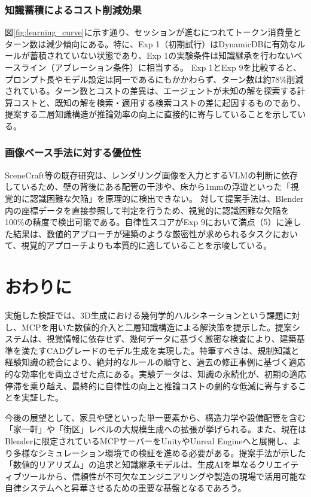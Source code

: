 \documentclass[dvipdfmx, a4paper, 9pt]{deimj}
\begin{document}
\subsubsection{知識蓄積によるコスト削減効果}
図\ref{fig:learning_curve}に示す通り、セッションが進むにつれてトークン消費量とターン数は減少傾向にある。特に、Exp 1（初期試行）はDynamicDBに有効なルールが蓄積されていない状態であり、Exp 1の実験条件は知識継承を行わないベースライン（アブレーション条件）に相当する。
Exp 1とExp 9を比較すると、プロンプト長やモデル設定は同一であるにもかかわらず、ターン数は約78\%削減されている。ターン数とコストの差異は、エージェントが未知の解を探索する計算コストと、既知の解を検索・適用する検索コストの差に起因するものであり、提案する二層知識構造が推論効率の向上に直接的に寄与していることを示している。

\subsubsection{画像ベース手法に対する優位性}
SceneCraft等の既存研究は、レンダリング画像を入力とするVLMの判断に依存しているため、壁の背後にある配管の干渉や、床から1mmの浮遊といった「視覚的に認識困難な欠陥」を原理的に検出できない。
対して提案手法は、Blender内の座標データを直接参照して判定を行うため、視覚的に認識困難な欠陥を100\%の精度で検出可能である。自律性スコアがExp 9において満点（5）に達した結果は、数値的アプローチが建築のような厳密性が求められるタスクにおいて、視覚的アプローチよりも本質的に適していることを示唆している。

\section{おわりに}

実施した検証では、3D生成における幾何学的ハルシネーションという課題に対し、MCPを用いた数値的介入と二層知識構造による解決策を提示した。提案システムは、視覚情報に依存せず、幾何データに基づく厳密な検査により、建築基準を満たすCADグレードのモデル生成を実現した。特筆すべきは、規制知識と経験知識の統合により、絶対的なルールの順守と、過去の修正事例に基づく適応的な効率化を両立させた点にある。実験データは、知識の永続化が、初期の適応停滞を乗り越え、最終的に自律性の向上と推論コストの劇的な低減に寄与することを実証した。

今後の展望として、家具や壁といった単一要素から、構造力学や設備配管を含む「家一軒」や「街区」レベルの大規模生成への拡張が挙げられる。また、現在はBlenderに限定されているMCPサーバーをUnityやUnreal Engineへと展開し、より多様なシミュレーション環境での検証を進める必要がある。提案手法が示した「数値的リアリズム」の追求と知識継承モデルは、生成AIを単なるクリエイティブツールから、信頼性が不可欠なエンジニアリングや製造の現場で活用可能な自律システムへと昇華させるための重要な基盤となるであろう。




\end{document}
